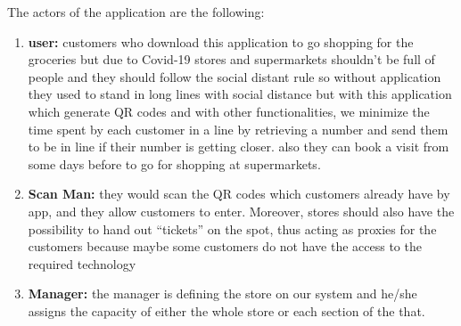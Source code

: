 The actors of the application are the following:

\begin{enumerate}
\item \textbf{user:} customers who download this application to go shopping for the groceries but due to Covid-19 stores and supermarkets shouldn't be full of people and they should follow the social distant rule so without application they used to stand in long lines with social distance but with this application which generate QR codes and with other functionalities, we minimize the time spent by each customer in a line by retrieving a number and send them to be in line if their number is getting closer. also they can book a visit from some days before to go for shopping at supermarkets.

\item \textbf{Scan Man:} they would scan the QR codes which customers already have by app, and they allow customers to enter. Moreover, stores should also have the possibility to hand out “tickets” on the spot, thus acting as proxies for the customers because maybe some customers do not have the  access to the required technology

\item \textbf{Manager:} the manager is defining the store on our system and he/she assigns the capacity of either the whole store or each section of the that.
\end{enumerate}